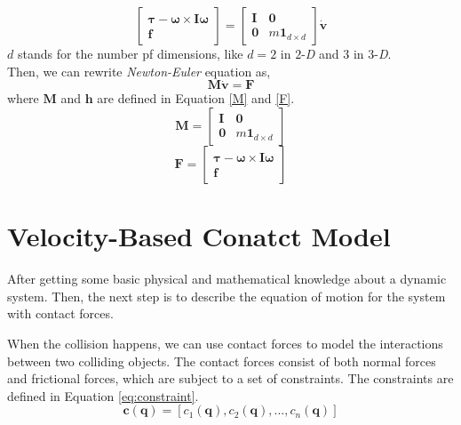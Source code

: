     \begin{equation}
        \left[ \begin{array}{c} \pmb{\tau} - \pmb{\omega} \times \pmb{I} \pmb{\omega}\\ \pmb{f} \end{array}\right] = \left[ \begin{array}{cc} \pmb{I} & \pmb{0} \\ \pmb{0}& m\pmb{1}_{d\times d}\end{array} \right] \dot{\mathbf{v}}
    \end{equation}
    $d$ stands for the number pf dimensions, like $d=2$ in $2$-\textit{D} and $3$ in $3$-\textit{D}. \\

    Then, we can rewrite \textit{Newton-Euler} equation as,
    \begin{equation}
        \pmb{M}\dot{\mathbf{v}} = \mathbf{F}
        \label{eq:newton}
    \end{equation}
    where $\pmb{M}$ and $\mathbf{h}$ are defined in Equation \ref{M} and \ref{F}.
    \begin{equation}
        \pmb{M} = \left[ \begin{array}{cc} \pmb{I} & \pmb{0} \\ \pmb{0} & m\pmb{1}_{d \times d}\end{array} \right]
        \label{M}
    \end{equation}
    \begin{equation}
        \mathbf{F} = \left[ \begin{array}{c} \pmb{\tau} - \pmb{\omega} \times \pmb{I} \pmb{\omega}\\ \pmb{f} \end{array}\right]
        \label{F}
    \end{equation}


\section{Velocity-Based Conatct Model}
    After getting some basic physical and mathematical knowledge about a dynamic system. Then,  the next step is to describe the equation of motion for the system with contact forces. 

    When the collision happens, we can use contact forces to model the interactions between two colliding objects. The contact forces consist of both normal forces and frictional forces, which are subject to a set of constraints. The constraints are defined in Equation \ref{eq:constraint}.
    \begin{equation}
        \pmb{c}(\pmb{q}) = [c_1(\pmb{q}),c_2(\pmb{q}),...,c_n(\pmb{q})]
        \label{eq:constraint}
    \end{equation}

